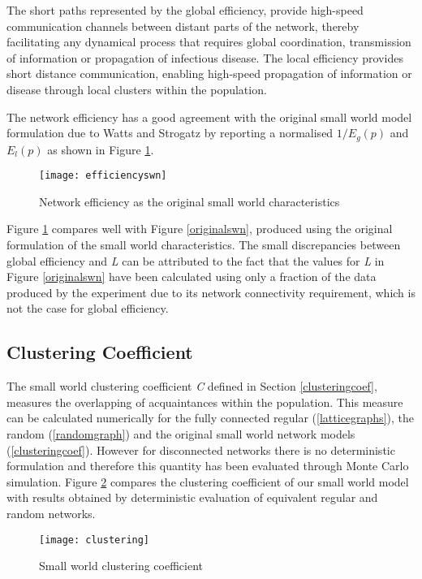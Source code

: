 The short paths represented by the global efficiency, provide high-speed communication
channels between distant parts of the network, thereby facilitating any dynamical process
that requires global coordination, transmission of information or propagation of
infectious disease. The local efficiency provides short distance communication, enabling
high-speed propagation of information or disease through local clusters within the
population.

The network efficiency has a good agreement with the original small world model
formulation due to Watts and Strogatz \cite{Watts1998} by reporting a normalised
$1/E_g(p)$ and $E_l(p)$ as shown in Figure \ref{efficiencyswn}.
\begin{figure}[h]
\begin{center}
\texttt{[image: efficiencyswn]}
\caption{Network efficiency as the original small world characteristics}
\label{efficiencyswn}
\end{center}
\end{figure}

Figure \ref{efficiencyswn} compares well with Figure \ref{originalswn}, produced using
the original formulation of the small world characteristics. The small discrepancies
between global efficiency and \emph{L} can be attributed to the fact that the values for
\emph{L} in Figure \ref{originalswn} have been calculated using only a fraction of the
data produced by the experiment due to its network connectivity requirement, which is not
the case for global efficiency.


\subsection{Clustering Coefficient}\label{swnclustering}

The small world clustering coefficient \emph{C} defined in Section \ref{clusteringcoef},
measures the overlapping of acquaintances within the population. This measure can be
calculated numerically for the fully connected regular (\ref{latticegraphs}), the random
(\ref{randomgraph}) and the original small world network models (\ref{clusteringcoef}).
However for disconnected networks there is no deterministic formulation and therefore
this quantity has been evaluated through Monte Carlo simulation. Figure \ref{clustering}
compares the clustering coefficient of our small world model with results obtained by
deterministic evaluation of equivalent regular and random networks.
\begin{figure}[ht]
\texttt{[image: clustering]}
\caption{Small world clustering coefficient} \label{clustering}
\end{figure}

